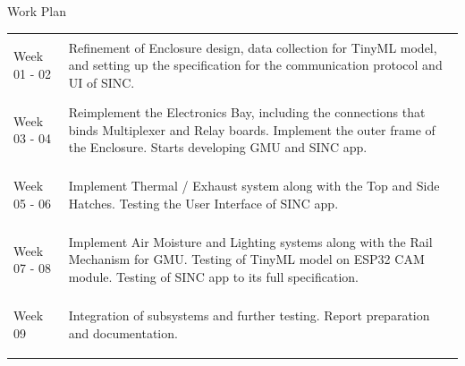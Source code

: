 \documentclass{beamer}
\begin{document}
\begin{frame} {Work Plan}

    \renewcommand\arraystretch{1.75}
    \renewcommand\midrule{{\color{leafColorSecondary} \vspace{-8pt}\rule{\textwidth}{0.75pt}\vspace{8pt}}}


    \begin{tabularx} {\textwidth} {
            >{\bfseries \raggedright \arraybackslash}m{2cm} >{\raggedright \arraybackslash}X
        }

        Week 01 - 02
        &
        Refinement of Enclosure design, data collection for TinyML model, and setting up
        the specification for the communication protocol and UI of SINC.
        \\ \midrule

        Week 03 - 04
        &
        Reimplement the Electronics Bay, including the connections that binds Multiplexer and
        Relay boards. Implement the outer frame of the Enclosure. Starts developing GMU and
        SINC app.
        \\ \midrule

        Week 05 - 06
        &
        Implement Thermal / Exhaust system along with the Top and Side Hatches. Testing
        the User Interface of SINC app.
        \\ \midrule

        Week 07 - 08
        &
        Implement Air Moisture and Lighting systems along with the Rail Mechanism for GMU. Testing
        of TinyML model on ESP32 CAM module. Testing of SINC app to its full specification.
        \\ \midrule

        Week 09
        &
        Integration of subsystems and further testing. Report preparation and documentation.

        \\

    \end{tabularx}

\end{frame}
\end{document}
